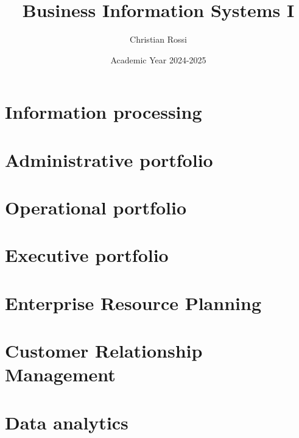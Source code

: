 \documentclass[12pt, a4paper]{report}
\title{\textbf{Business Information Systems I}}
\author{Christian Rossi}
\date{Academic Year 2024-2025}
\begin{document}
    \maketitle

    

    \cleardoublepage{}

    \tableofcontents

    \cleardoublepage{}

    \chapter{Information processing}
    
    
    
    
    

    \chapter{Administrative portfolio}
    

    \chapter{Operational portfolio}
    
    

    \chapter{Executive portfolio}
    
    
    

    \chapter{Enterprise Resource Planning}
    
    
    

    \chapter{Customer Relationship Management}

    \chapter{Data analytics}
\end{document}
